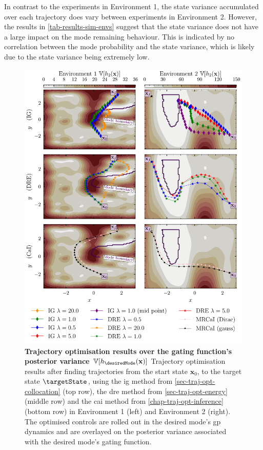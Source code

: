 \documentclass{mimosis-class/mimosis}
\numberwithin{equation}{chapter}
\newcommand{\state}{\ensuremath{\mathbf{x}}}
\begin{document}
{In contrast to the experiments in Environment 1, the state variance accumulated over each trajectory does vary
between experiments in Environment 2.
However, the results in  \cref{tab-results-sim-envs} suggest that the state variance does not have a large impact
on the mode remaining behaviour.
This is indicated by no correlation between the mode probability and the state variance,
which is likely due to the state variance being extremely low.
\begin{figure}
\centering
\includegraphics[width=\textwidth]{./images/mode-opt/trajectory_optimisation/all_trajectories_over_gating_variance_both_scenarios.pdf}
\caption[Trajectory optimisation results over the gating function's posterior variance]{\textbf{Trajectory optimisation results over the gating function's posterior variance $\mathbb{V}[h_{\desiredMode}(\state)]$}
Trajectory optimisation results after finding trajectories from the start state $\state_0$,
to the target state $\targetState$, using the \acrfull{ig} method
from \cref{sec-traj-opt-collocation}
(top row), the \acrfull{dre} method from \cref{sec-traj-opt-energy} (middle row) and the
\acrfull{cai} method from \cref{chap-traj-opt-inference} (bottom row) in Environment 1 (left)
and Environment 2 (right).
The optimised controls are rolled out in the desired mode's \acrshort{gp} dynamics and are overlayed on the
posterior variance associated with the desired mode's gating function.}
\label{fig-all-traj-opt-variance}
\end{figure}
\newline

}
\end{document}
